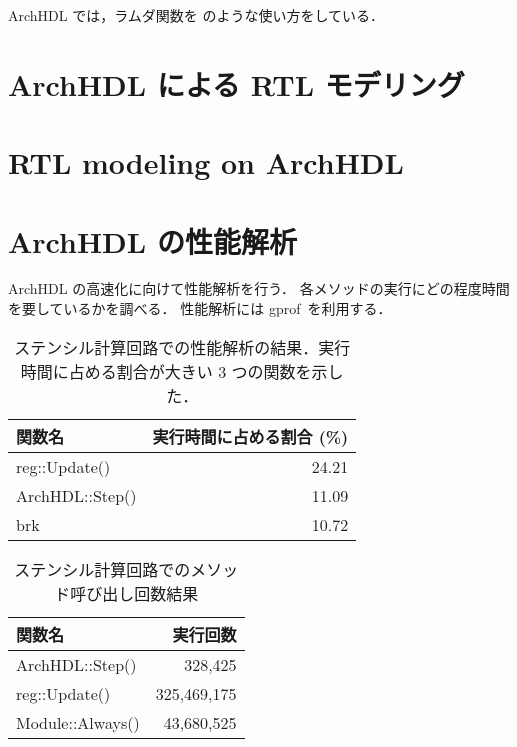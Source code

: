 ArchHDL では，ラムダ関数を 
のような使い方をしている．

\section{ArchHDL による RTL モデリング \label{ss:modeling}}



\fi

\section{RTL modeling on ArchHDL}




\section{ArchHDL の性能解析 \label{ss:profiling}}

ArchHDL の高速化に向けて性能解析を行う．
各メソッドの実行にどの程度時間を要しているかを調べる．
性能解析には gprof~\cite{gprof}を利用する．

\begin{table}[t]
 \caption{ステンシル計算回路での性能解析の結果．実行時間に占める割合が大きい 3 つの関数を示した．}
 \label{table:stencil_prof}
 \begin{center}
  \begin{tabular}{l|r} \hline
  関数名 & 実行時間に占める割合 (\%) \\ \hline
  reg::Update() & 24.21 \\
  ArchHDL::Step() & 11.09 \\
  brk & 10.72 \\ \hline
  \end{tabular}
 \end{center}
\end{table}

\begin{table}[t]
 \caption{ステンシル計算回路でのメソッド呼び出し回数結果}
 \label{table:stencil_method_call_count}
 \begin{center}
  \begin{tabular}{l|r} \hline
  関数名 & 実行回数 \\ \hline
  ArchHDL::Step()   &     328,425 \\
  reg::Update()     & 325,469,175 \\
  Module::Always()  &  43,680,525 \\ \hline
  \end{tabular}
 \end{center}
\end{table}


